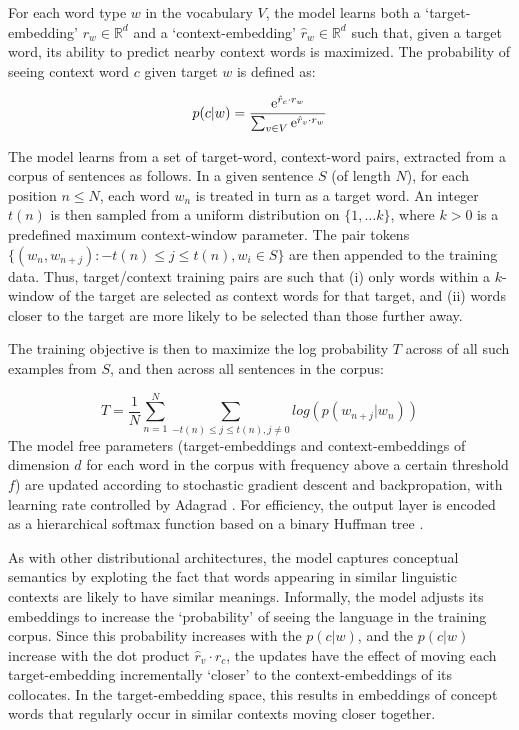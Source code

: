 For each word type \(w\) in the vocabulary \(V\), the model learns both a `target-embedding' \( r_{w} \in \mathbb{R}^d\) and a `context-embedding' \(\hat{r}_{w} \in \mathbb{R}^d\) such that, given a target word, its ability to predict nearby context words is maximized. The probability of seeing context word \(c\) given target \(w\) is defined as:  

\[p(c|w)  = \frac{\mathrm{e}^{\hat{r}_{c} \cdot r_{w}}}{\sum_{v \in V} \mathrm{e}^{\hat{r}_v\cdot r_{w}}}    \] 

The model learns from a set of target-word, context-word pairs, extracted from a corpus of sentences as follows. In a given sentence \(S\) (of length \(N\)), for each position \( n \leq N\), each word \(w_n\) is treated in turn as a target word. An integer \( {t(n)} \) is then sampled from a uniform distribution on \( \{1, \dots k \} \), where \(k > 0\) is a predefined maximum context-window parameter. The pair tokens \( \{(w_n, w_{n+j}): -{t(n)}\leq j \leq {t(n)}, w_i \in S \}\) are then appended to the training data. Thus, target/context training pairs are such that (i) only words within a \(k\)-window of the target are selected as context words for that target, and (ii) words closer to the target are more likely to be selected than those further away.

The training objective is then to maximize the log probability \( T\) across of all such examples from \(S\), and then across all sentences in the corpus:
 
\[ T = \frac{1}{N} \sum_{n=1}^{N} \sum_{-{t(n)}\leq j \leq {t(n)}, j\neq 0} log(  p(w_{n+j}|w_{n}) ) \]The model free parameters (target-embeddings and context-embeddings of dimension \(d\) for each word in the corpus with frequency above a certain threshold \(f\)) are updated according to stochastic gradient descent and backpropation, with learning rate controlled by Adagrad \cite{duchi2011adaptive}. For efficiency, the output layer is encoded as a hierarchical softmax function based on a binary Huffman tree \cite{morin2005hierarchical}. 

As with other distributional architectures, the model captures conceptual semantics by exploting the fact that words appearing in similar linguistic contexts are likely to have similar meanings. Informally, the model adjusts its embeddings to increase the `probability' of seeing the language in the training corpus. Since this probability increases with the \(p(c|w)\), and the \(p(c|w)\) increase with the dot product \( \hat{r}_v\cdot r_{c} \), the updates have the effect of moving each target-embedding incrementally `closer' to the context-embeddings of its collocates. In the target-embedding space, this results in embeddings of concept words that regularly occur in similar contexts moving closer together.   


